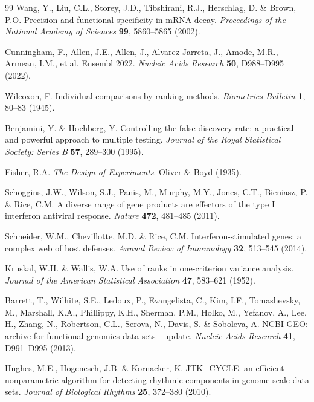 \documentclass[11pt,letterpaper]{article}
\begin{document}
\begin{thebibliography}{99}
Wang, Y., Liu, C.L., Storey, J.D., Tibshirani, R.J., Herschlag, D. \& Brown, P.O.
Precision and functional specificity in mRNA decay.
\textit{Proceedings of the National Academy of Sciences} \textbf{99}, 5860--5865 (2002).

Cunningham, F., Allen, J.E., Allen, J., Alvarez-Jarreta, J., Amode, M.R., Armean, I.M., et al.
Ensembl 2022.
\textit{Nucleic Acids Research} \textbf{50}, D988--D995 (2022).

Wilcoxon, F.
Individual comparisons by ranking methods.
\textit{Biometrics Bulletin} \textbf{1}, 80--83 (1945).

Benjamini, Y. \& Hochberg, Y.
Controlling the false discovery rate: a practical and powerful approach to multiple testing.
\textit{Journal of the Royal Statistical Society: Series B} \textbf{57}, 289--300 (1995).

Fisher, R.A.
\textit{The Design of Experiments}.
Oliver \& Boyd (1935).

Schoggins, J.W., Wilson, S.J., Panis, M., Murphy, M.Y., Jones, C.T., Bieniasz, P. \& Rice, C.M.
A diverse range of gene products are effectors of the type I interferon antiviral response.
\textit{Nature} \textbf{472}, 481--485 (2011).

Schneider, W.M., Chevillotte, M.D. \& Rice, C.M.
Interferon-stimulated genes: a complex web of host defenses.
\textit{Annual Review of Immunology} \textbf{32}, 513--545 (2014).

Kruskal, W.H. \& Wallis, W.A.
Use of ranks in one-criterion variance analysis.
\textit{Journal of the American Statistical Association} \textbf{47}, 583--621 (1952).

Barrett, T., Wilhite, S.E., Ledoux, P., Evangelista, C., Kim, I.F., Tomashevsky, M., Marshall, K.A., Phillippy, K.H., Sherman, P.M., Holko, M., Yefanov, A., Lee, H., Zhang, N., Robertson, C.L., Serova, N., Davis, S. \& Soboleva, A.
NCBI GEO: archive for functional genomics data sets---update.
\textit{Nucleic Acids Research} \textbf{41}, D991--D995 (2013).

Hughes, M.E., Hogenesch, J.B. \& Kornacker, K.
JTK\_CYCLE: an efficient nonparametric algorithm for detecting rhythmic components in genome-scale data sets.
\textit{Journal of Biological Rhythms} \textbf{25}, 372--380 (2010).


\end{thebibliography}
\end{document}
